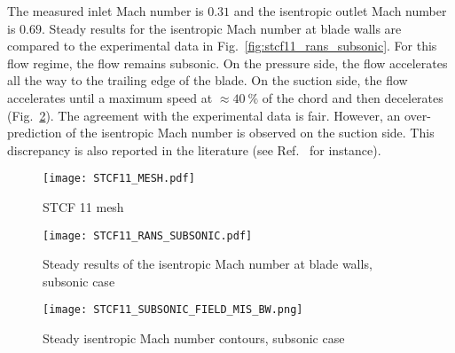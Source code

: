 
The measured inlet Mach number is $0.31$ and the isentropic outlet Mach number is $0.69$.
Steady results for the isentropic Mach number at blade walls are compared to the experimental data in 
Fig.~\ref{fig:stcf11_rans_subsonic}.  For this flow regime, the flow
remains subsonic.
On the pressure side, the flow accelerates all the way
to the trailing edge of the blade. On the suction side, the flow
accelerates until a maximum speed at $\approx 40~\%$ of the chord and
then decelerates (Fig.~\ref{fig:stcf11_subsonic_field_mis_bw}).
The agreement with the experimental data is fair. However, an
over-prediction of the isentropic Mach number is observed on the suction
side.  This discrepancy is also reported in the literature (see
Ref.~\cite{Fransson1999} for instance).
\begin{figure}[htb]
  \centering
  \texttt{[image: STCF11\_MESH.pdf]}
  \caption{STCF 11 mesh}
  \label{fig:stcf11_mesh}
\end{figure}

\begin{figure}[htb]
  \centering
  \begin{minipage}[b]{.46\linewidth}
    \centering
    \texttt{[image: STCF11\_RANS\_SUBSONIC.pdf]}
    \caption{Steady results of the isentropic Mach number at blade
      walls, subsonic case}
    \label{fig:stcf11_rans_subsonic}
  \end{minipage}\quad
  \begin{minipage}[b]{.46\linewidth}
    \centering
    \texttt{[image: STCF11\_SUBSONIC\_FIELD\_MIS\_BW.png]}
    \caption{Steady isentropic Mach number contours, subsonic case}
    \label{fig:stcf11_subsonic_field_mis_bw}
  \end{minipage}
\end{figure}


